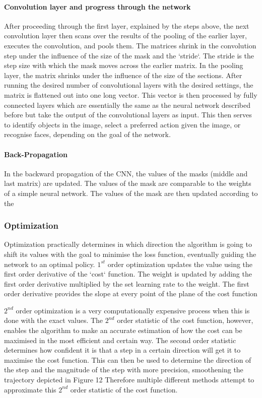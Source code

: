\paragraph{Convolution layer and progress through the network}
After proceeding through the first layer, explained by the steps above, the next convolution layer then scans over the results of the pooling of the earlier layer, executes the convolution, and pools them. The matrices shrink in the convolution step under the influence of the size of the mask and the `stride`. The stride is the step size with which the mask moves across the earlier matrix. In the pooling layer, the matrix shrinks under the influence of the size of the sections. 
After running the desired number of convolutional layers with the desired settings, the matrix is flattened out into one long vector. This vector is then processed by fully connected layers which are essentially the same as the neural network described before but take the output of the convolutional layers as input. This then serves to identify objects in the image, select a preferred action given the image, or recognise faces, depending on the goal of the network.

\paragraph{Back-Propagation}
In the backward propagation of the CNN, the values of the masks (middle and last matrix) are updated. The values of the mask are comparable to the weights of a simple neural network. The values of the mask are then updated according to the

\subsubsection*{Optimization} 
Optimization practically determines in which direction the algorithm is going to shift its values with the goal to minimise the loss function, eventually guiding the network to an optimal policy.
$1^{st}$ order optimization updates the value using the first order derivative of the `cost` function. The weight is updated by adding the first order derivative multiplied by the set learning rate to the weight. The first order derivative provides the slope at every point of the plane of the cost function

$2^{nd}$ order optimization is a very computationally expensive process when this is done with the exact values. The $2^{nd}$ order statistic of the cost function, however, enables the algorithm to make an accurate estimation of how the cost can be maximised in the most efficient and certain way. The second order statistic determines how confident it is that a step in a certain direction will get it to maximise the cost function. This can then be used to determine the direction of the step and the magnitude of the step with more precision, smoothening the trajectory depicted in Figure 12  Therefore multiple different methods attempt to approximate this $2^{nd}$ order statistic of the cost function. 

